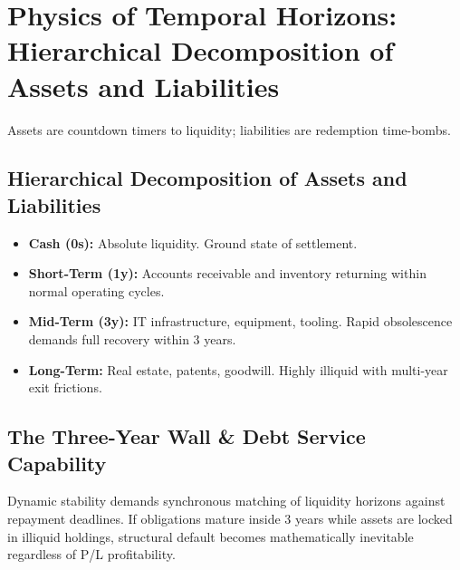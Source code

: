 \else
\chapter{Physics of Temporal Horizons: Hierarchical Decomposition of Assets and Liabilities}
\label{chap:time_horizon}

Assets are countdown timers to liquidity; liabilities are redemption time-bombs.

\section{Hierarchical Decomposition of Assets and Liabilities}


\begin{itemize}
    \item \textbf{Cash (0s):} Absolute liquidity. Ground state of settlement.
    \item \textbf{Short-Term (1y):} Accounts receivable and inventory returning within normal operating cycles.
    \item \textbf{Mid-Term (3y):} IT infrastructure, equipment, tooling. Rapid obsolescence demands full recovery within 3 years.
    \item \textbf{Long-Term:} Real estate, patents, goodwill. Highly illiquid with multi-year exit frictions.
\end{itemize}

\section{The Three-Year Wall \& Debt Service Capability}
Dynamic stability demands synchronous matching of liquidity horizons against repayment deadlines. If obligations mature inside 3 years while assets are locked in illiquid holdings, structural default becomes mathematically inevitable regardless of P/L profitability.
\fi
